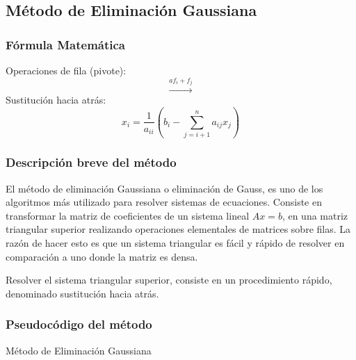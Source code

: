 \documentclass[12pt]{article}
\begin{document}
\subsection{Método de Eliminación Gaussiana}
\subsubsection{Fórmula Matemática}
Operaciones de fila (pivote):
    \[\xrightarrow{af_i + f_j}\]
Sustitución hacia atrás:
\vspace{1mm}
\[
       x_i = \frac{1}{a_{ii}}(b_i-\sum_{j=i+1}^{n}a_{ij}x_{j})
\]

\subsubsection{Descripción breve del método}
El método de eliminación Gaussiana o eliminación de Gauss, es uno de los algoritmos más utilizado para resolver sistemas de ecuaciones. Consiste en transformar la matriz de coeficientes de un sistema lineal \(Ax=b\), en una matriz triangular superior realizando operaciones elementales de matrices sobre filas. La razón de hacer esto es que un sistema triangular es fácil y rápido de resolver en comparación a uno donde la matriz es densa.

Resolver el sistema triangular superior, consiste en un procedimiento rápido, denominado sustitución hacia atrás.

\subsubsection{Pseudocódigo del método}
\begin{algorithm}[H]
\caption{Método de Eliminación Gaussiana}
    \SetAlgoLined
    
\end{algorithm}
\end{document}
